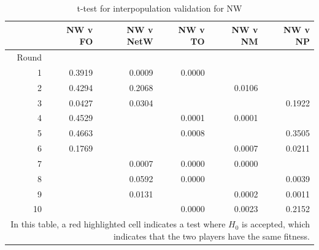 \begin{table}[htbp]
  \centering
  \caption{t-test for interpopulation validation for NW}
    \begin{tabular}{rrrrrr}
    \toprule
          & NW v FO & NW v NetW & NW v TO & NW v NM & NW v NP \\
    \midrule
    Round &                                 &                                   
          &                                 &                                 
          &    \\
    1     & \cellcolor{red!55!white}0.3919  & 0.0009    
          &                         0.0000  &            
          &                                \\
    2     & \cellcolor{red!55!white}0.4294  & \cellcolor{red!55!white}0.2068
          &                                 & \cellcolor{red!55!white}0.0106  
          &         \\
    3     & \cellcolor{red!55!white}0.0427  & \cellcolor{red!55!white}0.0304
          &                                 &                                 
          & \cellcolor{red!55!white}0.1922          \\
    4     & \cellcolor{red!55!white}0.4529  &
          &                         0.0001  &                         0.0001 
          &          \\
    5     & \cellcolor{red!55!white}0.4663  &
          &                         0.0008  &                                 
          & \cellcolor{red!55!white}0.3505          \\
    6     & \cellcolor{red!55!white}0.1769  &
          &                                 &                         0.0007  
          & \cellcolor{red!55!white}0.0211 \\
    7     &                                 &                         0.0007
          &                          0.0000 &                         0.0000 
          &    \\
    8     &                                 & \cellcolor{red!55!white}0.0592
          &                         0.0000  &                                 
          &                         0.0039          \\
    9     &                                 & \cellcolor{red!55!white}0.0131
          &                                 &                         0.0002  
          &                         0.0011          \\
    10    &                                 &                                   
          &                         0.0000  &                         0.0023  
          & \cellcolor{red!55!white}0.2152          \\
    \bottomrule 
  \multicolumn{6}{p{0.8\linewidth}}{In this table, a red highlighted cell
  indicates a test where $H_{0}$ is accepted, which indicates that the two
  players have the same fitness.}
    \end{tabular}%
  \label{tab:interpop_ttest1}%
\end{table}%

